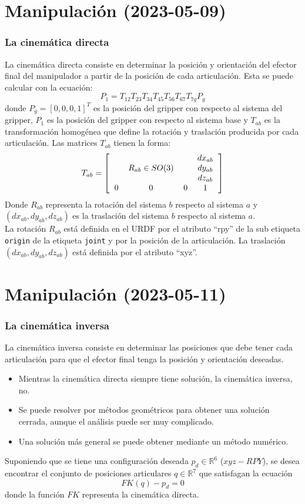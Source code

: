 \section{Manipulación (2023-05-09)}
\begin{frame}\frametitle{La cinemática directa}
  La cinemática directa consiste en determinar la posición y orientación del efector final del manipulador a partir de la posición de cada articulación.  Esta se puede calcular con la ecuación:
  \[P_1 = T_{12}T_{23}T_{34}T_{45}T_{56}T_{67}T_{7g}P_g\]
  donde $P_g = [0,0,0,1]^T$ es la posición del gripper con respecto al sistema del gripper, $P_1$ es la posición del gripper con respecto al sistema base y $T_{ab}$ es la transformación homogénea que define la rotación y traslación producida por cada articulación. Las matrices $T_{ab}$
  tienen la forma:
  \[T_{ab} = \left[\begin{tabular}{cccc}
      & & & $dx_{ab}$\\
      & $R_{ab}\in SO(3)$ & & $dy_{ab}$\\
      & & & $dz_{ab}$\\
      0 & 0& 0 & 1
    \end{tabular}\right]\]
  Donde $R_{ab}$ representa la rotación del sistema $b$ respecto al sistema $a$ y $(dx_{ab}, dy_{ab}, dz_{ab})$ es la traslación del sistema $b$ respecto al sistema $a$.\\
  La rotación $R_{ab}$ está definida en el URDF por el atributo ``rpy'' de la sub etiqueta \texttt{origin} de la etiqueta \texttt{joint} y por la posición de la articulación. La traslación $(dx_{ab}, dy_{ab}, dz_{ab})$ está definida por el atributo ``xyz''. 
\end{frame}

\section{Manipulación (2023-05-11)}
\begin{frame}\frametitle{La cinemática inversa}
  La cinemática inversa consiste en determinar las posiciones que debe tener cada articulación para que el efector final tenga la posición y orientación deseadas.
  \begin{itemize}
  \item Mientras la cinemática directa siempre tiene solución, la cinemática inversa, no.
  \item Se puede resolver por métodos geométricos para obtener una solución cerrada, aunque el análisis puede ser muy complicado.
  \item Una solución más general se puede obtener mediante un método numérico. 
  \end{itemize}
  Suponiendo que se tiene una configuración deseada $p_d \in \mathbb{R}^6$ ($xyz-RPY$), se desea encontrar el conjunto de posiciones articulares $q\in\mathbb{R}^7$ que satisfagan la ecuación
  \[FK(q) - p_d = 0\]
  donde la función $FK$ representa la cinemática directa. 
\end{frame}


